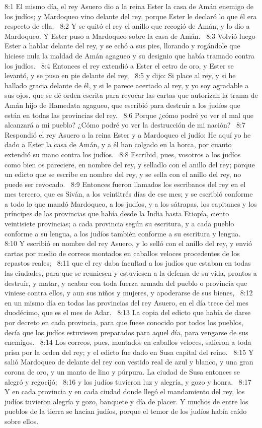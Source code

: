8:1 El mismo día, el rey Asuero dio a la reina Ester la casa de Amán enemigo de los judíos; y Mardoqueo vino delante del rey, porque Ester le declaró lo que él era respecto de ella.  
8:2 Y se quitó el rey el anillo que recogió de Amán, y lo dio a Mardoqueo. Y Ester puso a Mardoqueo sobre la casa de Amán.  
8:3 Volvió luego Ester a hablar delante del rey, y se echó a sus pies, llorando y rogándole que hiciese nula la maldad de Amán agagueo y su designio que había tramado contra los judíos.  
8:4 Entonces el rey extendió a Ester el cetro de oro, y Ester se levantó, y se puso en pie delante del rey,  
8:5 y dijo: Si place al rey, y si he hallado gracia delante de él, y si le parece acertado al rey, y yo soy agradable a sus ojos, que se dé orden escrita para revocar las cartas que autorizan la trama de Amán hijo de Hamedata agagueo, que escribió para destruir a los judíos que están en todas las provincias del rey.  
8:6 Porque ¿cómo podré yo ver el mal que alcanzará a mi pueblo? ¿Cómo podré yo ver la destrucción de mi nación?  
8:7 Respondió el rey Asuero a la reina Ester y a Mardoqueo el judío: He aquí yo he dado a Ester la casa de Amán, y a él han colgado en la horca, por cuanto extendió su mano contra los judíos.  
8:8 Escribid, pues, vosotros a los judíos como bien os pareciere, en nombre del rey, y selladlo con el anillo del rey; porque un edicto que se escribe en nombre del rey, y se sella con el anillo del rey, no puede ser revocado.  
8:9 Entonces fueron llamados los escribanos del rey en el mes tercero, que es Siván, a los veintitrés días de ese mes; y se escribió conforme a todo lo que mandó Mardoqueo, a los judíos, y a los sátrapas, los capitanes y los príncipes de las provincias que había desde la India hasta Etiopía, ciento veintisiete provincias; a cada provincia según su escritura, y a cada pueblo conforme a su lengua, a los judíos también conforme a su escritura y lengua.  
8:10 Y escribió en nombre del rey Asuero, y lo selló con el anillo del rey, y envió cartas por medio de correos montados en caballos veloces procedentes de los repastos reales;  
8:11 que el rey daba facultad a los judíos que estaban en todas las ciudades, para que se reuniesen y estuviesen a la defensa de su vida, prontos a destruir, y matar, y acabar con toda fuerza armada del pueblo o provincia que viniese contra ellos, y aun sus niños y mujeres, y apoderarse de sus bienes,  
8:12 en un mismo día en todas las provincias del rey Asuero, en el día trece del mes duodécimo, que es el mes de Adar.  
8:13 La copia del edicto que había de darse por decreto en cada provincia, para que fuese conocido por todos los pueblos, decía que los judíos estuviesen preparados para aquel día, para vengarse de sus enemigos.  
8:14 Los correos, pues, montados en caballos veloces, salieron a toda prisa por la orden del rey; y el edicto fue dado en Susa capital del reino.  
8:15 Y salió Mardoqueo de delante del rey con vestido real de azul y blanco, y una gran corona de oro, y un manto de lino y púrpura. La ciudad de Susa entonces se alegró y regocijó;  
8:16 y los judíos tuvieron luz y alegría, y gozo y honra.  
8:17 Y en cada provincia y en cada ciudad donde llegó el mandamiento del rey, los judíos tuvieron alegría y gozo, banquete y día de placer. Y muchos de entre los pueblos de la tierra se hacían judíos, porque el temor de los judíos había caído sobre ellos.  

